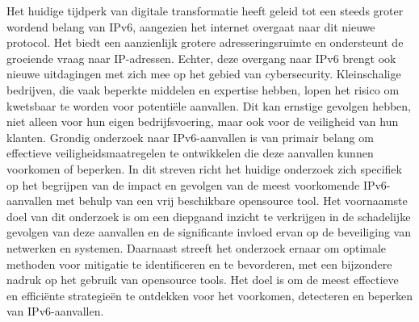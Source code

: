 Het huidige tijdperk van digitale transformatie heeft geleid tot een steeds groter wordend belang van IPv6, aangezien het internet overgaat naar dit nieuwe protocol. Het biedt een aanzienlijk grotere adresseringsruimte en ondersteunt de groeiende vraag naar IP-adressen. Echter, deze overgang naar IPv6 brengt ook nieuwe uitdagingen met zich mee op het gebied van cybersecurity. Kleinschalige bedrijven, die vaak beperkte middelen en expertise hebben, lopen het risico om kwetsbaar te worden voor potentiële aanvallen. Dit kan ernstige gevolgen hebben, niet alleen voor hun eigen bedrijfsvoering, maar ook voor de veiligheid van hun klanten.
Grondig onderzoek naar IPv6-aanvallen is van primair belang om effectieve veiligheidsmaatregelen te ontwikkelen die deze aanvallen kunnen voorkomen of beperken. In dit streven richt het huidige onderzoek zich specifiek op het begrijpen van de impact en gevolgen van de meest voorkomende IPv6-aanvallen met behulp van een vrij beschikbare opensource tool. Het voornaamste doel van dit onderzoek is om een diepgaand inzicht te verkrijgen in de schadelijke gevolgen van deze aanvallen en de significante invloed ervan op de beveiliging van netwerken en systemen. Daarnaast streeft het onderzoek ernaar om optimale methoden voor mitigatie te identificeren en te bevorderen, met een bijzondere nadruk op het gebruik van opensource tools. Het doel is om de meest effectieve en efficiënte strategieën te ontdekken voor het voorkomen, detecteren en beperken van IPv6-aanvallen.
